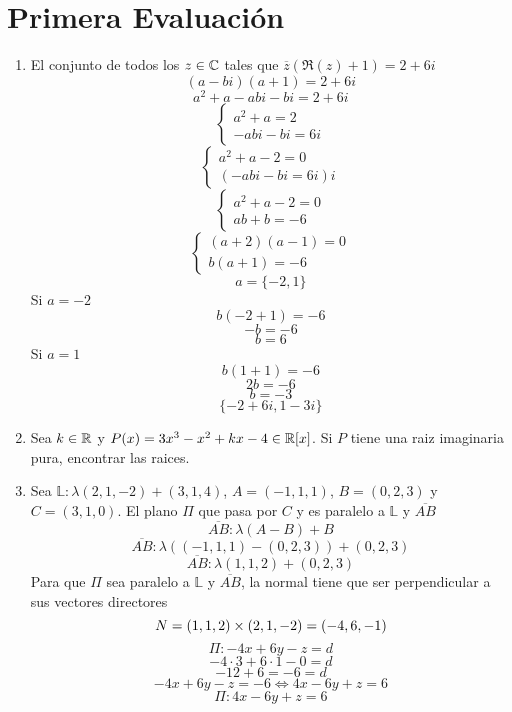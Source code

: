 \documentclass[../practica.root.tex]{subfiles}
\begin{document}
\section{Primera Evaluación}
\begin{enumerate}
    \item El conjunto de todos los \( z \in \mathbb{C} \) tales que \(\overline{z}(\Re(z) + 1) = 2 + 6i\)
          \[ (a - bi)(a + 1) = 2 + 6i \]
          \[ a^2 + a - abi - bi = 2 + 6i \]
          \[
              \begin{cases}
                  a^2 + a = 2 \\
                  -abi - bi = 6i
              \end{cases}
          \] \[
              \begin{cases}
                  a^2 + a -2 = 0 \\
                  (-abi - bi = 6i)i
              \end{cases}
          \] \[
              \begin{cases}
                  a^2 + a -2 = 0 \\
                  ab + b = -6
              \end{cases}
          \] \[
              \begin{cases}
                  (a + 2)(a - 1) = 0 \\
                  b(a + 1) = -6
              \end{cases}
          \] \[
              a = \{ -2, 1 \}
          \]
          Si \(a = -2\)
          \[ b(-2 + 1) = -6 \]
          \[ -b = -6 \]
          \[ b = 6 \]
          Si \(a = 1\)
          \[ b(1 + 1) = -6 \]
          \[ 2b = -6 \]
          \[ b = -3 \]
          \[ \boxed{\{ -2 + 6i, 1 -3i \}} \]

    \item Sea \(k \in \mathbb{R}\) y \(P(x) = 3x^3 - x^2 + kx - 4 \in \mathbb{R}[x]\). Si \(P\) tiene una raiz imaginaria pura, encontrar las raices.


    \item Sea \(\mathbb{L}: \lambda(2, 1, -2) + (3,1,4)\), \(A = (-1,1,1)\), \(B = (0,2,3)\) y \(C = (3,1,0)\). El plano \(\Pi\) que pasa por \(C\) y es paralelo a \(\mathbb{L}\) y \(\overline{AB}\)
          \[ \overline{AB}: \lambda(A-B) + B \]
          \[ \overline{AB}: \lambda((-1,1,1)-(0,2,3)) + (0,2,3) \]
          \[ \overline{AB}: \lambda(1, 1, 2) + (0, 2, 3) \]
          Para que \(\Pi\) sea paralelo a \(\mathbb{L}\) y \(\overline{AB}\), la normal tiene que ser perpendicular a sus vectores directores
          \[ N = (1, 1, 2)\times(2, 1, -2) = (-4, 6, -1) \]
          \[ \Pi : -4x + 6y - z = d \]
          \[ -4\cdot3 + 6\cdot1 - 0 = d \]
          \[ -12 + 6 = -6 = d \]
          \[ -4x + 6y - z = -6 \iff 4x - 6y + z = 6  \]
          \[ \boxed{\Pi : 4x - 6y + z = 6} \]


\end{enumerate}
\end{document}
